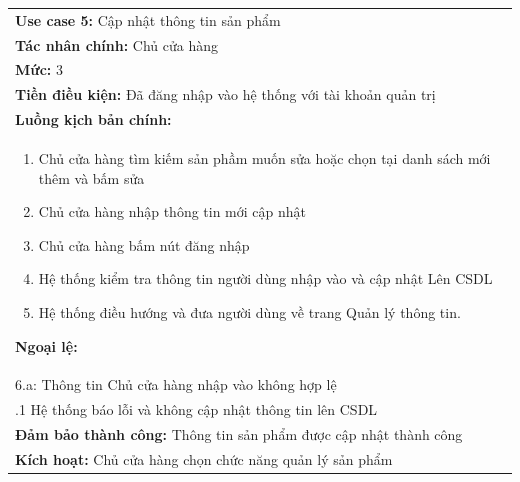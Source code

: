 \begin{center}
\begin{tabularx}{\linewidth}{|X|}
\cline{1-2}
    \textbf{Use case 5:} Cập nhật thông tin sản phẩm\\
    \textbf{Tác nhân chính:} Chủ cửa hàng\\
    \textbf{Mức:} 3\\
    \textbf{Tiền điều kiện:} Đã đăng nhập vào hệ thống với tài khoản quản trị\\
    \textbf{Luồng kịch bản chính:}\\
    \begin{enumerate}
        \vspace{-2em}
        \itemsep-0.5em
        \item Chủ cửa hàng tìm kiếm sản phầm muốn sửa hoặc chọn tại danh sách mới thêm và bấm sửa
        \item Chủ cửa hàng nhập thông tin mới cập nhật
        \item Chủ cửa hàng bấm nút đăng nhập
        \item Hệ thống kiểm tra thông tin người dùng nhập vào và cập nhật Lên CSDL
        \item Hệ thống điều hướng và đưa người dùng về trang Quản lý thông tin.
        \vspace{-1em}
    \end{enumerate}
    \textbf{Ngoại lệ:}\\
    \hspace{1em}6.a: Thông tin Chủ cửa hàng nhập vào không hợp lệ\\
    \hspace{2.5em}.1 Hệ thống báo lỗi và không cập nhật thông tin lên CSDL\\
    \textbf{Đảm bảo thành công:} Thông tin sản phẩm được cập nhật thành công\\
    \textbf{Kích hoạt:} Chủ cửa hàng chọn chức năng quản lý sản phẩm
\cline{1-2}
\end{tabularx}
\end{center}
\newpage
